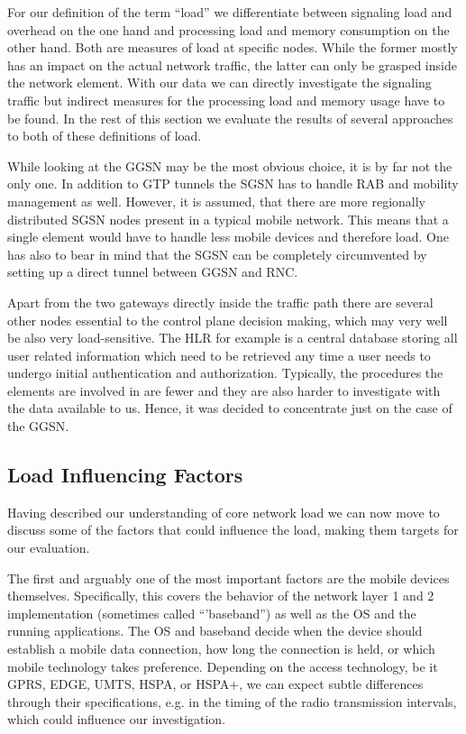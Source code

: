 For our definition of the term ``load'' we differentiate between signaling load and overhead on the one hand and processing load and memory consumption on the other hand. Both are measures of load at specific nodes. While the former mostly has an impact on the actual network traffic, the latter can only be grasped inside the network element. With our data we can directly investigate the signaling traffic but indirect measures for the processing load and memory usage have to be found. In the rest of this section we evaluate the results of several approaches to both of these definitions of load.

While looking at the \gls{GGSN} may be the most obvious choice, it is by far not the only one. 
In addition to GTP tunnels the \gls{SGSN} has to handle \gls{RAB} and mobility management as well. However, it is assumed, that there are more regionally distributed \gls{SGSN} nodes present in a typical mobile network. This means that a single element would have to handle less mobile devices and therefore load. One has also to bear in mind that the \gls{SGSN} can be completely circumvented by setting up a direct tunnel between \gls{GGSN} and \gls{RNC}.

Apart from the two gateways directly inside the traffic path there are several other nodes essential to the control plane decision making, which may very well be also very load-sensitive. The \gls{HLR} for example is a central database storing all user related information which need to be retrieved any time a user needs to undergo initial authentication and authorization. Typically, the procedures the elements are involved in are fewer and they are also harder to investigate with the data available to us. Hence, it was decided to concentrate just on the case of the \gls{GGSN}.


\subsection{Load Influencing Factors}

Having described our understanding of core network load we can now move to discuss some of the factors that could influence the load, making them targets for our evaluation.

The first and arguably one of the most important factors are the mobile devices themselves. Specifically, this covers the behavior of the network layer 1 and 2 implementation (sometimes called ``'baseband'') as well as the \gls{OS} and the running applications. The OS and baseband decide when the device should establish a mobile data connection, how long the connection is held, or which mobile technology takes preference. Depending on the access technology, be it \acrshort{GPRS}, \acrshort{EDGE}, \acrshort{UMTS}, \acrshort{HSPA}, or \acrshort{HSPA+}, we can expect subtle differences through their specifications, e.g. in the timing of the radio transmission intervals, which could influence our investigation. 

